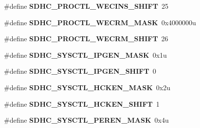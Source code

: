 \begin{DoxyCompactItemize}
\item 
\hypertarget{group___s_d_h_c___register___masks_ga33b81350df7f8c5cc698135c271bbfbb}{}\#define {\bfseries S\+D\+H\+C\+\_\+\+P\+R\+O\+C\+T\+L\+\_\+\+W\+E\+C\+I\+N\+S\+\_\+\+S\+H\+I\+F\+T}~25\label{group___s_d_h_c___register___masks_ga33b81350df7f8c5cc698135c271bbfbb}

\item 
\hypertarget{group___s_d_h_c___register___masks_ga296669c47b763f48caf28c35c1be2240}{}\#define {\bfseries S\+D\+H\+C\+\_\+\+P\+R\+O\+C\+T\+L\+\_\+\+W\+E\+C\+R\+M\+\_\+\+M\+A\+S\+K}~0x4000000u\label{group___s_d_h_c___register___masks_ga296669c47b763f48caf28c35c1be2240}

\item 
\hypertarget{group___s_d_h_c___register___masks_ga6f445b202ea272428a7507952b79a889}{}\#define {\bfseries S\+D\+H\+C\+\_\+\+P\+R\+O\+C\+T\+L\+\_\+\+W\+E\+C\+R\+M\+\_\+\+S\+H\+I\+F\+T}~26\label{group___s_d_h_c___register___masks_ga6f445b202ea272428a7507952b79a889}

\item 
\hypertarget{group___s_d_h_c___register___masks_ga35cc08217531a736cec185c65abe7f82}{}\#define {\bfseries S\+D\+H\+C\+\_\+\+S\+Y\+S\+C\+T\+L\+\_\+\+I\+P\+G\+E\+N\+\_\+\+M\+A\+S\+K}~0x1u\label{group___s_d_h_c___register___masks_ga35cc08217531a736cec185c65abe7f82}

\item 
\hypertarget{group___s_d_h_c___register___masks_ga9ef6104b46076dd92183a99579d95771}{}\#define {\bfseries S\+D\+H\+C\+\_\+\+S\+Y\+S\+C\+T\+L\+\_\+\+I\+P\+G\+E\+N\+\_\+\+S\+H\+I\+F\+T}~0\label{group___s_d_h_c___register___masks_ga9ef6104b46076dd92183a99579d95771}

\item 
\hypertarget{group___s_d_h_c___register___masks_gaefb48b61c548dd73ba8ae645d6e0c889}{}\#define {\bfseries S\+D\+H\+C\+\_\+\+S\+Y\+S\+C\+T\+L\+\_\+\+H\+C\+K\+E\+N\+\_\+\+M\+A\+S\+K}~0x2u\label{group___s_d_h_c___register___masks_gaefb48b61c548dd73ba8ae645d6e0c889}

\item 
\hypertarget{group___s_d_h_c___register___masks_gab4bc40b459bbe0c405262109e6765e69}{}\#define {\bfseries S\+D\+H\+C\+\_\+\+S\+Y\+S\+C\+T\+L\+\_\+\+H\+C\+K\+E\+N\+\_\+\+S\+H\+I\+F\+T}~1\label{group___s_d_h_c___register___masks_gab4bc40b459bbe0c405262109e6765e69}

\item 
\hypertarget{group___s_d_h_c___register___masks_ga23b3d2c76db562da51b824fa435f306c}{}\#define {\bfseries S\+D\+H\+C\+\_\+\+S\+Y\+S\+C\+T\+L\+\_\+\+P\+E\+R\+E\+N\+\_\+\+M\+A\+S\+K}~0x4u\label{group___s_d_h_c___register___masks_ga23b3d2c76db562da51b824fa435f306c}


\end{DoxyCompactItemize}
